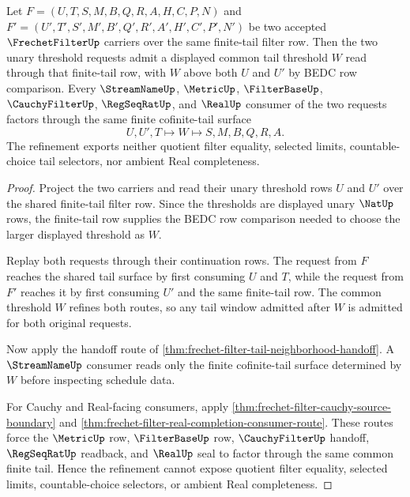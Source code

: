 \begin{theorem}
\label{thm:frechet-filter-tail-common-refinement}
Let $F=(U,T,S,M,B,Q,R,A,H,C,P,N)$ and $F'=(U',T',S',M',B',Q',R',A',H',C',P',N')$ be two accepted $\FrechetFilterUp$ carriers over the same finite-tail filter row. Then the two unary threshold requests admit a displayed common tail threshold $W$ read through that finite-tail row, with $W$ above both $U$ and $U'$ by BEDC row comparison. Every $\StreamNameUp$, $\MetricUp$, $\FilterBaseUp$, $\CauchyFilterUp$, $\RegSeqRatUp$, and $\RealUp$ consumer of the two requests factors through the same finite cofinite-tail surface
$$
U,U',T \longmapsto W \longmapsto S,M,B,Q,R,A .
$$
The refinement exports neither quotient filter equality, selected limits, countable-choice tail selectors, nor ambient Real completeness.
\end{theorem}
\begin{proof}
Project the two carriers and read their unary threshold rows $U$ and $U'$ over the shared finite-tail filter row. Since the thresholds are displayed unary $\NatUp$ rows, the finite-tail row supplies the BEDC row comparison needed to choose the larger displayed threshold as $W$.

Replay both requests through their continuation rows. The request from $F$ reaches the shared tail surface by first consuming $U$ and $T$, while the request from $F'$ reaches it by first consuming $U'$ and the same finite-tail row. The common threshold $W$ refines both routes, so any tail window admitted after $W$ is admitted for both original requests.

Now apply the handoff route of \autoref{thm:frechet-filter-tail-neighborhood-handoff}. A $\StreamNameUp$ consumer reads only the finite cofinite-tail surface determined by $W$ before inspecting schedule data.

For Cauchy and Real-facing consumers, apply \autoref{thm:frechet-filter-cauchy-source-boundary} and \autoref{thm:frechet-filter-real-completion-consumer-route}. These routes force the $\MetricUp$ row, $\FilterBaseUp$ row, $\CauchyFilterUp$ handoff, $\RegSeqRatUp$ readback, and $\RealUp$ seal to factor through the same common finite tail. Hence the refinement cannot expose quotient filter equality, selected limits, countable-choice selectors, or ambient Real completeness.
\end{proof}

